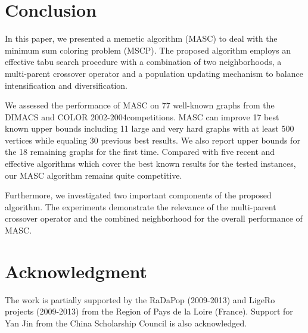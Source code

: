 \documentclass{elsart}
\begin{document}
\section{Conclusion}
\label{Sec_Conclusion}

In this paper, we presented a memetic algorithm (MASC) to deal with the minimum sum coloring problem (MSCP). The proposed algorithm employs an effective tabu search procedure with a combination of two neighborhoods, a multi-parent crossover operator and a population updating mechanism to balance intensification and diversification.

We assessed the performance of MASC on 77 well-known graphs from the DIMACS and COLOR 2002-2004competitions. MASC can improve 17 best known upper bounds including 11 large and very hard graphs with at least 500 vertices while equaling 30 previous best results. We also report upper bounds for the 18 remaining graphs for the first time. Compared with five recent and effective algorithms which cover the best known results for the tested instances, our MASC algorithm remains quite competitive.

Furthermore, we investigated two important components of the proposed algorithm. The experiments demonstrate the relevance of the multi-parent crossover operator and the combined neighborhood for the overall performance of MASC. 


\section*{Acknowledgment}
The work is partially supported by the RaDaPop (2009-2013) and LigeRo projects (2009-2013) from the Region of Pays de la Loire (France). Support for Yan Jin from the China Scholarship Council is also acknowledged. 
\end{document}
